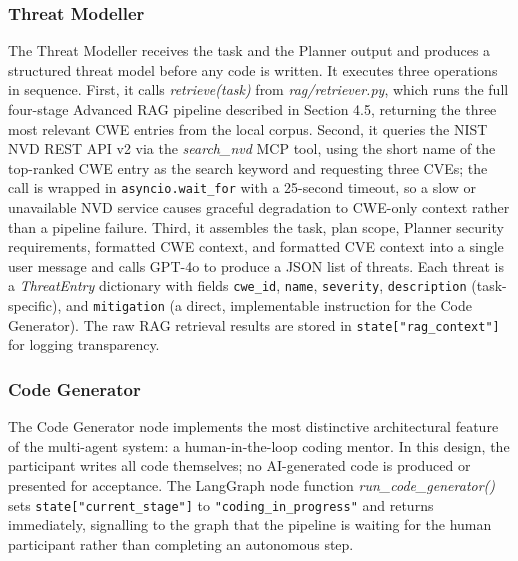 \subsubsection*{Threat Modeller}

The Threat Modeller receives the task and the Planner output and produces a structured threat model before any code is written. It executes three operations in sequence. First, it calls \textit{retrieve(task)} from \textit{rag/retriever.py}, which runs the full four-stage Advanced RAG pipeline described in Section 4.5, returning the three most relevant CWE entries from the local corpus. Second, it queries the NIST NVD REST API v2 via the \textit{search\_nvd} MCP tool, using the short name of the top-ranked CWE entry as the search keyword and requesting three CVEs; the call is wrapped in \texttt{asyncio.wait\_for} with a 25-second timeout, so a slow or unavailable NVD service causes graceful degradation to CWE-only context rather than a pipeline failure. Third, it assembles the task, plan scope, Planner security requirements, formatted CWE context, and formatted CVE context into a single user message and calls GPT-4o to produce a JSON list of threats. Each threat is a \textit{ThreatEntry} dictionary with fields \texttt{cwe\_id}, \texttt{name}, \texttt{severity}, \texttt{description} (task-specific), and \texttt{mitigation} (a direct, implementable instruction for the Code Generator). The raw RAG retrieval results are stored in \texttt{state["rag\_context"]} for logging transparency.

\subsubsection*{Code Generator}

The Code Generator node implements the most distinctive architectural feature of the multi-agent system: a human-in-the-loop coding mentor. In this design, the participant writes all code themselves; no AI-generated code is produced or presented for acceptance. The LangGraph node function \textit{run\_code\_generator()} sets \texttt{state["current\_stage"]} to \texttt{"coding\_in\_progress"} and returns immediately, signalling to the graph that the pipeline is waiting for the human participant rather than completing an autonomous step.

